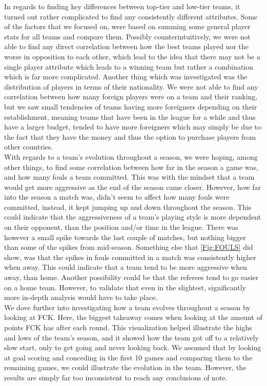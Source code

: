 \documentclass[Report.tex]{subfiles}
\begin{document}
In regards to finding key differences between top-tier and low-tier teams, it turned out rather complicated to find any consistently different attributes. Some of the factors that we focused on, were based on summing some general player stats for all teams and compare them. Possibly counterintuitively, we were not able to find any direct correlation between how the best teams played nor the worse in opposition to each other, which lead to the idea that there may not be a single player attribute which leads to a winning team but rather a combination which is far more complicated. Another thing which was investigated was the distribution of players in terms of their nationality. We were not able to find any correlation between how many foreign players were on a team and their ranking, but we saw small tendencies of teams having more foreigners depending on their establishment, meaning teams that have been in the league for a while and thus have a larger budget, tended to have more foreigners which may simply be due to the fact that they have the money and thus the option to purchase players from other countries. \\

With regards to a team's evolution throughout a season, we were hoping, among other things, to find some correlation between how far in the season a game was, and how many fouls a team committed.
This was with the mindset that a team would get more aggressive as the end of the season came closer. However, how far into the season a match was, didn't seem to affect how many fouls were committed, instead, it kept jumping up and down throughout the season. This could indicate that the aggressiveness of a team's playing style is more dependent on their opponent, than the position and/or time in the league. There was however a small spike towards the last couple of matches, but nothing bigger than some of the spikes from mid-season. Something else that \ref{Fig:FOULS} did show, was that the spikes in fouls committed in a match was consistently higher when away. This could indicate that a team tend to be more aggressive when away, than home. Another possibility could be that the referees tend to go easier on a home team. However, to validate that even in the slightest, significantly more in-depth analysis would have to take place. \\

We dove further into investigating how a team evolves throughout a season by looking at FCK. Here, the biggest takeaway comes when looking at the amount of points FCK has after each round. This visualization helped illustrate the highs and lows of the team’s season, and it showed how the team got off to a relatively slow start, only to get going and never looking back. We assumed that by looking at goal scoring and conceding in the first 10 games and comparing them to the remaining games, we could illustrate the evolution in the team. However, the results are simply far too inconsistent to reach any conclusions of note. 
\end{document}
